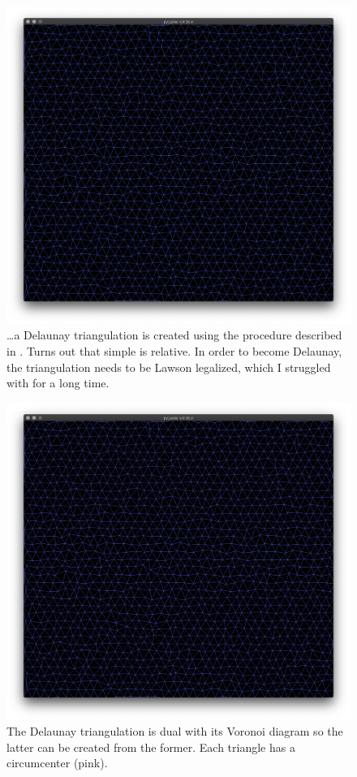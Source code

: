 \documentclass[a4paper,12pt]{article}
\begin{document}
\begin{figure}[ht]
  \centering
  \includegraphics[width=\linewidth]{images/delaunay.png}
  \caption{…a Delaunay triangulation is created using the procedure
    described in \citep{Yonghe:2013}. Turns out that simple is relative.
    In order to become Delaunay, the triangulation needs to be Lawson
    legalized, which I struggled with for a long time.
  \label{fig:delaunay}}
\end{figure}

\begin{figure}[ht]
  \centering
  \includegraphics[width=\linewidth]{images/circumcenters.png}
  \caption{The Delaunay triangulation is dual with its Voronoi diagram so
    the latter can be created from the former. Each triangle has a circumcenter (pink).
  \label{fig:circumcenters}}
\end{figure}
\end{document}
